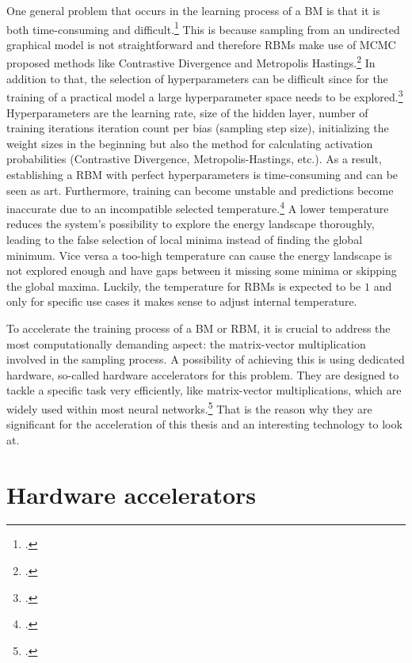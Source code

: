 One general problem that occurs in the learning process of a \ac{BM} is that it is both time-consuming and difficult.\footcite[cf.][1-2]{fischerIntroductionRestrictedBoltzmann2012}
This is because sampling from an undirected graphical model is not straightforward and therefore \ac{RBM}s make use
of \ac{MCMC} proposed methods like Contrastive Divergence and Metropolis Hastings.\footcite[cf.][2]{fischerIntroductionRestrictedBoltzmann2012}
In addition to that, the selection of hyperparameters can be difficult since for the training of a practical model a large hyperparameter space needs to be explored.\footcite[cf.][536]{larochelleClassificationUsingDiscriminative2008}
Hyperparameters are the learning rate, size of the hidden layer, number of training iterations iteration count per bias (sampling step size), initializing the weight sizes in the beginning but also the method for calculating activation probabilities (Contrastive Divergence, Metropolis-Hastings, etc.).
As a result, establishing a \ac{RBM} with perfect hyperparameters is time-consuming and can be seen as art.
Furthermore, training can become unstable and predictions become inaccurate due to an incompatible selected temperature.\footcite[cf.][3-4]{huembeliPhysicsEnergybasedModels2022}
A lower temperature reduces the system's possibility to explore the energy landscape thoroughly, leading to the false selection of local minima instead of finding the global minimum.
Vice versa a too-high temperature can cause the energy landscape is not explored enough and have gaps between it missing some minima or skipping the global maxima. 
Luckily, the temperature for \ac{RBM}s is expected to be \( 1 \) and only for specific use cases it makes sense to adjust internal temperature.

To accelerate the training process of a \ac{BM} or \ac{RBM}, it is crucial to address the most computationally demanding aspect: the matrix-vector multiplication involved in the sampling process.
A possibility of achieving this is using dedicated hardware, so-called hardware accelerators for this problem. 
They are designed to tackle a specific task very efficiently, like matrix-vector multiplications, which are widely used within most neural networks.\footcite[cf.][3881-3882]{lehnertMostResourceEfficient2023}
That is the reason why they are significant for the acceleration of this thesis and an interesting technology to look at.  


\section{Hardware accelerators}
